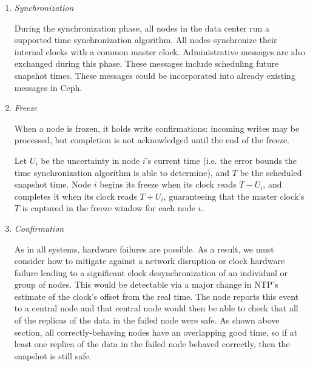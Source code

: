 \begin{enumerate}

\item \emph{Synchronization}

  During the synchronization phase, all nodes in the data center run a supported time
  synchronization algorithm. All nodes synchronize their
  internal clocks with a common master
  clock\footnotemark. Administrative messages are also exchanged
  during this phase. These messages include scheduling future snapshot
  times. These messages could be incorporated into already existing messages
  in Ceph.


\item \emph{Freeze}
  
  When a node is frozen, it holds write confirmations: incoming writes
  may be processed, but completion is not acknowledged until the end
  of the freeze.
  
  Let $U_i$ be the uncertainty in node $i$'s current time (i.e. the
  error bounds the time synchronization algorithm is able to
  determine), and $T$ be the scheduled snapshot time. Node $i$ begins
  its freeze when its clock reads $T - U_i$, and completes it when its
  clock reads $T + U_i$, guaranteeing that the master clock's $T$ is
  captured in the freeze window for each node $i$.

\item \emph{Confirmation}

  As in all systems, hardware failures are possible. As a result, we
  must consider how to mitigate against a network disruption or clock
  hardware failure leading to a significant clock desynchronization of
  an individual or group of nodes. This would be detectable via a major
  change in NTP's estimate of the clock's offset from the real time.
  The node reports this event to a central node and that central node would 
  then be able to check that all of the replicas of the data in the failed 
  node were safe. As shown above section, all correctly-behaving nodes have an
  overlapping good time, so if at least one replica of the data in the failed 
  node behaved correctly, then the snapshot is still safe.
  

\end{enumerate}
